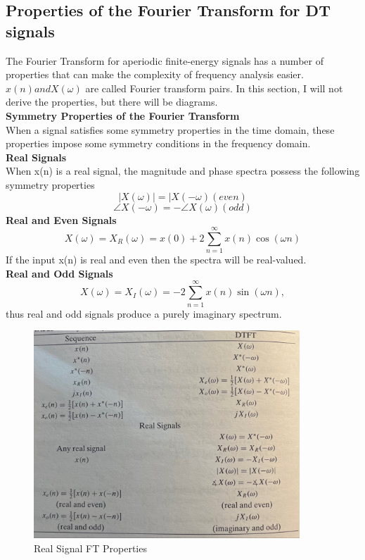 \documentclass{article} %
\begin{document}
	\subsection{Properties of the Fourier Transform for DT signals}
	The Fourier Transform for aperiodic finite-energy signals has a number of properties that can make the complexity of frequency
	analysis easier. $x(n) and X(\omega)$ are called Fourier transform pairs. In this section, I will not derive the properties, but
	there will be diagrams. \\
	\textbf{Symmetry Properties of the Fourier Transform}\\
	When a signal satisfies some symmetry properties in the time domain, these properties impose some symmetry conditions in the frequency
	domain.\\
	\textbf{Real Signals}\\
	When x(n) is a real signal, the magnitude and phase spectra possess the following symmetry properties
	\begin{equation}
	|X(\omega)| = |X(-\omega) (even)
	\end{equation}
	\begin{equation}
	\angle X(-\omega) = - \angle X(\omega) (odd)
	\end{equation}
	\textbf{Real and Even Signals}
	\begin{equation}
	X(\omega) = X_R(\omega) = x(0) + 2\sum_{n=1}^{\infty}x(n) \cos(\omega n)
	\end{equation} 
	If the input x(n) is real and even then the spectra will be real-valued.\\
	\textbf{Real and Odd Signals}
	\begin{equation}
	X(\omega) = X_I(\omega) = -2\sum_{n=1}^{\infty}x(n) \sin(\omega n), 
	\end{equation}
	thus real and odd signals produce a purely imaginary spectrum. 
	\begin{figure}[h]
	\centering
	\includegraphics[width=10cm]{real}
	\caption{Real Signal FT Properties}
	\end{figure}
\end{document}
